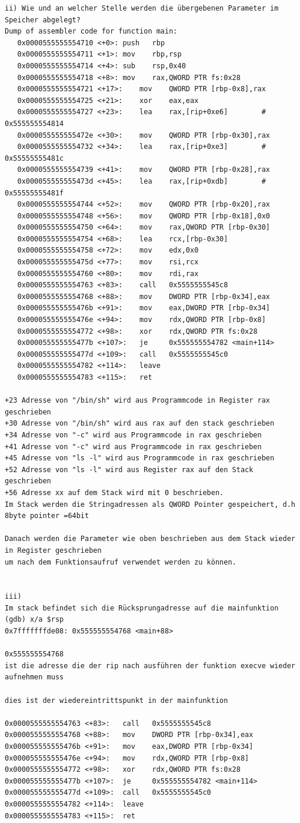 \documentclass[12pt]{article}
\begin{document}
\begin{lstlisting}
ii) Wie und an welcher Stelle werden die übergebenen Parameter im Speicher abgelegt?
Dump of assembler code for function main:
   0x0000555555554710 <+0>:	push   rbp
   0x0000555555554711 <+1>:	mov    rbp,rsp
   0x0000555555554714 <+4>:	sub    rsp,0x40
   0x0000555555554718 <+8>:	mov    rax,QWORD PTR fs:0x28
   0x0000555555554721 <+17>:	mov    QWORD PTR [rbp-0x8],rax
   0x0000555555554725 <+21>:	xor    eax,eax
   0x0000555555554727 <+23>:	lea    rax,[rip+0xe6]        # 0x555555554814
   0x000055555555472e <+30>:	mov    QWORD PTR [rbp-0x30],rax
   0x0000555555554732 <+34>:	lea    rax,[rip+0xe3]        # 0x55555555481c
   0x0000555555554739 <+41>:	mov    QWORD PTR [rbp-0x28],rax
   0x000055555555473d <+45>:	lea    rax,[rip+0xdb]        # 0x55555555481f
   0x0000555555554744 <+52>:	mov    QWORD PTR [rbp-0x20],rax
   0x0000555555554748 <+56>:	mov    QWORD PTR [rbp-0x18],0x0
   0x0000555555554750 <+64>:	mov    rax,QWORD PTR [rbp-0x30]
   0x0000555555554754 <+68>:	lea    rcx,[rbp-0x30]
   0x0000555555554758 <+72>:	mov    edx,0x0
   0x000055555555475d <+77>:	mov    rsi,rcx
   0x0000555555554760 <+80>:	mov    rdi,rax
   0x0000555555554763 <+83>:	call   0x5555555545c8
   0x0000555555554768 <+88>:	mov    DWORD PTR [rbp-0x34],eax
   0x000055555555476b <+91>:	mov    eax,DWORD PTR [rbp-0x34]
   0x000055555555476e <+94>:	mov    rdx,QWORD PTR [rbp-0x8]
   0x0000555555554772 <+98>:	xor    rdx,QWORD PTR fs:0x28
   0x000055555555477b <+107>:	je     0x555555554782 <main+114>
   0x000055555555477d <+109>:	call   0x5555555545c0
   0x0000555555554782 <+114>:	leave  
   0x0000555555554783 <+115>:	ret  

+23 Adresse von "/bin/sh" wird aus Programmcode in Register rax geschrieben 
+30 Adresse von "/bin/sh" wird aus rax auf den stack geschrieben
+34 Adresse von "-c" wird aus Programmcode in rax geschrieben
+41 Adresse von "-c" wird aus Programmcode in rax geschrieben
+45 Adresse von "ls -l" wird aus Programmcode in rax geschrieben
+52 Adresse von "ls -l" wird aus Register rax auf den Stack geschrieben
+56 Adresse xx auf dem Stack wird mit 0 beschrieben.
Im Stack werden die Stringadressen als QWORD Pointer gespeichert, d.h 8byte pointer =64bit

Danach werden die Parameter wie oben beschrieben aus dem Stack wieder in Register geschrieben 
um nach dem Funktionsaufruf verwendet werden zu können.


iii)
Im stack befindet sich die Rücksprungadresse auf die mainfunktion
(gdb) x/a $rsp
0x7fffffffde08:	0x555555554768 <main+88>

0x555555554768
ist die adresse die der rip nach ausführen der funktion execve wieder aufnehmen muss

dies ist der wiedereintrittspunkt in der mainfunktion

0x0000555555554763 <+83>:	call   0x5555555545c8
0x0000555555554768 <+88>:	mov    DWORD PTR [rbp-0x34],eax
0x000055555555476b <+91>:	mov    eax,DWORD PTR [rbp-0x34]
0x000055555555476e <+94>:	mov    rdx,QWORD PTR [rbp-0x8]
0x0000555555554772 <+98>:	xor    rdx,QWORD PTR fs:0x28
0x000055555555477b <+107>:	je     0x555555554782 <main+114>
0x000055555555477d <+109>:	call   0x5555555545c0
0x0000555555554782 <+114>:	leave  
0x0000555555554783 <+115>:	ret    
\end{lstlisting}
\end{document}
